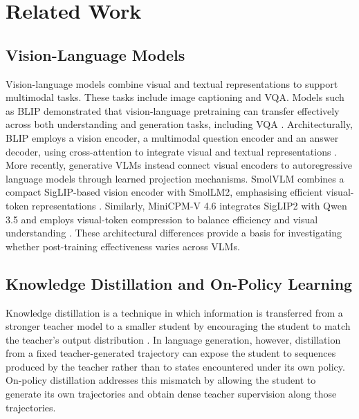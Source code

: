 \section{Related Work}\label{related_work}

\subsection{Vision-Language Models}

Vision-language models combine visual and textual representations to support multimodal tasks.
These tasks include image captioning and VQA. Models such as BLIP
demonstrated that vision-language pretraining can transfer effectively across both understanding
and generation tasks, including VQA \parencite{li2022blip}. Architecturally, BLIP employs a vision
encoder, a multimodal question encoder and an answer decoder, using cross-attention to integrate visual
and textual representations \parencite{li2022blip}. More recently, generative VLMs instead connect 
visual encoders to autoregressive language models through learned projection mechanisms. SmolVLM combines 
a compact SigLIP-based vision encoder with SmolLM2, emphasising efficient visual-token representations \parencite{marafioti2025smolvlm}.
Similarly, MiniCPM-V 4.6 integrates SigLIP2 with Qwen 3.5 and employs visual-token compression to balance
efficiency and visual understanding \parencite{marafioti2025smolvlm}. These architectural differences
provide a basis for investigating whether post-training effectiveness varies across VLMs.


\subsection{Knowledge Distillation and On-Policy Learning}

Knowledge distillation is a technique in which information is transferred from a stronger teacher model
to a smaller student by encouraging the student to match the teacher's output distribution
\parencite{hinton2015distilling}. In language generation, however, distillation from a fixed
teacher-generated trajectory can expose the student to sequences produced by the teacher rather
than to states encountered under its own policy. On-policy distillation addresses this
mismatch by allowing the student to generate its own trajectories and obtain dense teacher
supervision along those trajectories.

